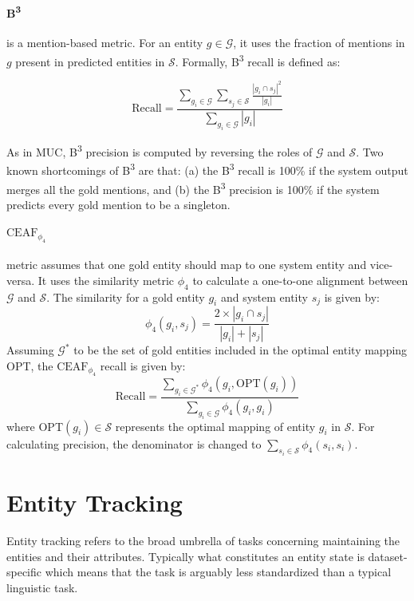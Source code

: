 \documentclass[12pt]{thesis-umich}[thesis]
\begin{document}
\paragraph{B\textsuperscript{3}} is a mention-based metric. For an entity $g \in \mathcal{G}$, it uses the fraction of mentions in $g$ present in predicted entities in $\mathcal{S}$. Formally, B\textsuperscript{3} recall is defined as: 

$$ \textrm{Recall} = \frac{\sum_{g_i \in \mathcal{G}} \sum_{s_j \in \mathcal{S}} \frac{|g_i \cap s_j|^2}{|g_i|}}{\sum_{g_i \in \mathcal{G}} |g_i|}$$

As in MUC, B\textsuperscript{3} precision is computed by reversing the roles of $\mathcal{G}$ and $\mathcal{S}$. Two known shortcomings of B\textsuperscript{3} are that:  (a)  the  B\textsuperscript{3} recall is 100\% if the system output merges all the gold mentions, and (b) the  B\textsuperscript{3} precision is 100\% if the system predicts every gold mention to be a singleton. 

\paragraph{$\text{CEAF}_{\phi_4}$} metric assumes that one gold entity should map to one system entity and vice-versa. It uses the similarity metric $\phi_4$ to calculate a one-to-one alignment between $\mathcal{G}$ and $\mathcal{S}$. The similarity for a gold entity $g_i$ and system entity $s_j$ is given by:
$$\phi_4(g_i, s_j) = \frac{2 \times |g_i \cap s_j|}{|g_i| + |s_j|}$$
Assuming $\mathcal{G}^*$ to be the set of gold entities included in the optimal entity mapping OPT, the $\text{CEAF}_{\phi_4}$ recall is given by:
$$ \textrm{Recall} = \frac{\sum_{g_i \in \mathcal{G}^*} \phi_4(g_i, \textrm{OPT}(g_i))}{\sum_{g_i \in \mathcal{G}} \phi_4(g_i, g_i)}$$
where OPT$(g_i) \in \mathcal{S}$ represents the optimal mapping of entity $g_i$ in $\mathcal{S}$. For calculating precision, the denominator is changed to  $\sum_{s_i \in \mathcal{S}} \phi_4(s_i, s_i)$. 













 \section{Entity Tracking}
Entity tracking refers to the broad umbrella of tasks concerning maintaining the entities and their attributes. Typically what constitutes an entity state is dataset-specific which means that the task is arguably less standardized than a typical linguistic task. 
\end{document}

